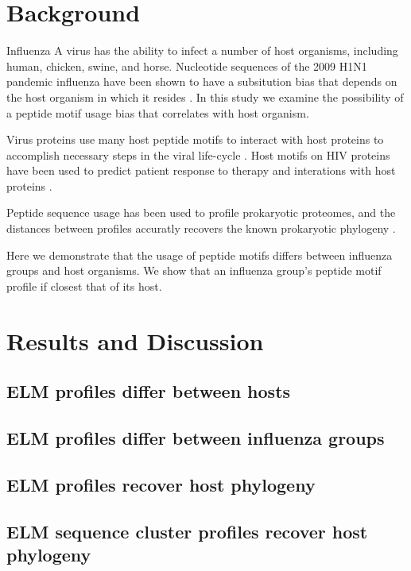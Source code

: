 \documentclass[10pt]{bmc_article}
\newenvironment{bmcformat}{\begin{raggedright}\baselineskip20pt\sloppy\setboolean{publ}{false}}{\end{raggedright}\baselineskip20pt\sloppy}
\begin{document}
\begin{bmcformat}
\section*{Background}
Influenza A virus has the ability to infect a number of host
organisms, including human, chicken, swine, and horse. Nucleotide
sequences of the 2009 H1N1 pandemic influenza have been shown to have
a subsitution bias that depends on the host organism in which it
resides \cite{solovyov2010host}. In this study we examine the
possibility of a peptide motif usage bias that correlates with host
organism.

Virus proteins use many host peptide motifs to interact with host
proteins to accomplish necessary steps in the viral life-cycle
\cite{kadaveru13viral}. Host motifs on HIV proteins have been used to
predict patient response to therapy and interations with host proteins
\cite{chan2009decoding}.

Peptide sequence usage has been used to profile prokaryotic proteomes,
and the distances between profiles accuratly recovers the known
prokaryotic phylogeny \cite{jun2010whole}.

Here we demonstrate that the usage of peptide motifs differs between
influenza groups and host organisms. We show that an influenza group's
peptide motif profile if closest that of its host.
 
\section*{Results and Discussion}
  \subsection*{ELM profiles differ between hosts}

  \subsection*{ELM profiles differ between influenza groups}

  \subsection*{ELM profiles recover host phylogeny}

  \subsection*{ELM sequence cluster profiles recover host phylogeny}


\end{bmcformat}
\end{document}
